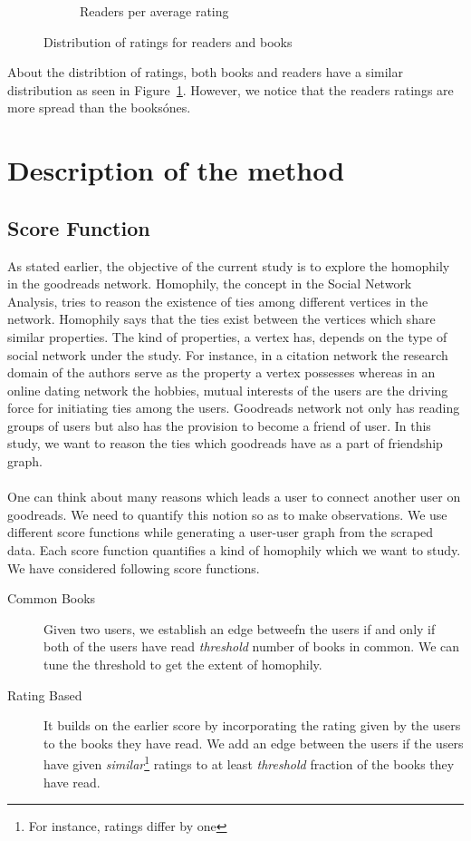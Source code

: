 \documentclass[11pt]{article}
\begin{document}
\begin{figure}
\begin{subfigure}[b]{0.5\textwidth}
                \caption{Readers per average rating}
        \end{subfigure}
        \caption{Distribution of ratings for readers and books}
        \label{fig:scatters}
\end{figure}

About the distribtion of ratings, both books and readers have a similar distribution as seen in Figure~\ref{fig:scatters}. However, we notice that the readers ratings are more spread than the books\' ones.


\section{Description of the method}
\label{sec:method}
\subsection{Score Function}
As stated earlier, the objective of the current study is to explore the homophily in the goodreads network. Homophily, the concept in the Social Network Analysis, tries to reason the existence of ties among different vertices in the network. Homophily says that the ties exist between the vertices which share similar properties. The kind of properties, a vertex has, depends on the type of social network under the study. For instance, in a citation network the research domain of the authors serve as the property a vertex possesses whereas in an online dating network the hobbies, mutual interests of the users are the driving force for initiating ties among the users. Goodreads network not only has reading groups of users but also has the provision to become a friend of user. In this study, we want to reason the ties which goodreads have as a part of friendship graph.\\\\
One can think about many reasons which leads a user to connect another user on goodreads. We need to quantify this notion so as to make observations. We use different score functions while generating a user-user graph from the scraped data. Each score function quantifies a kind of homophily which we want to study. We have considered following score functions.
\begin{description}
	\item[Common Books] Given two users, we establish an edge betweefn the users if and only if both of the users have read {\it threshold} number of books in common. We can tune the threshold to get the extent of homophily.
    \item[Rating Based] It builds on the earlier score by incorporating the rating given by the users to the books they have read. We add an edge between the users if the users have given {\it similar}\footnote{For instance, ratings differ by one} ratings to at least {\it threshold} fraction of the books they have read.
\end{description}
\end{document}
